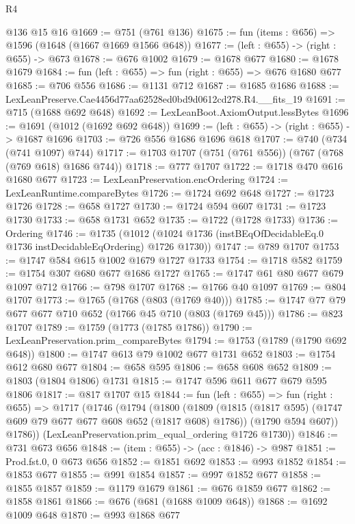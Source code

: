 \begin{lexlean}{R4}
\begin{coremodule}
    @136
    @15
    @16
@1669 := @751 (@761 @136)
@1675 := fun (items : @656) => @1596 (@1648 (@1667 @1669 @1566 @648))
@1677 := (left : @655) -> (right : @655) -> @673
@1678 := @676 @1002
@1679 := @1678 @677
@1680 := @1678 @1679
@1684 := fun (left : @655) => fun (right : @655) => @676 @1680 @677
@1685 := @706 @556
@1686 := @1131 @712
@1687 := @1685 @1686
@1688 := LexLeanPreserve.Cae4456d77aa62528ed0bd9d0612cd278.R4.__fits_19
@1691 := @715 (@1688 @692 @648)
@1692 := LexLeanBoot.AxiomOutput.lessBytes
@1696 := @1691 (@1012 (@1692 @692 @648))
@1699 := (left : @655) -> (right : @655) -> @1687 @1696
@1703 := @726 @556 @1686 @1696 @618
@1707 := @740 (@734 (@741 @1097) @744)
@1717 := @1703 @1707 (@751 (@761 @556)) (@767 (@768 (@769 @618) @1686 @744))
@1718 := @777 @1707
@1722 := @1718 @470 @616 @1680 @677
@1723 := LexLeanPreservation.encOrdering
@1724 := LexLeanRuntime.compareBytes
@1726 := @1724 @692 @648
@1727 := @1723 @1726
@1728 := @658 @1727
@1730 := @1724 @594 @607
@1731 := @1723 @1730
@1733 := @658 @1731 @652
@1735 := @1722 (@1728 @1733)
@1736 := Ordering
@1746 := @1735
    (@1012 (@1024 @1736 (instBEqOfDecidableEq.{0} @1736 instDecidableEqOrdering) @1726 @1730))
@1747 := @789 @1707
@1753 := @1747 @584 @615 @1002 @1679 @1727 @1733
@1754 := @1718 @582
@1759 := @1754 @307 @680 @677 @1686 @1727
@1765 := @1747 @61 @80 @677 @679 @1097 @712
@1766 := @798 @1707
@1768 := @1766 @40 @1097
@1769 := @804 @1707
@1773 := @1765 (@1768 (@803 (@1769 @40)))
@1785 := @1747 @77 @79 @677 @677 @710 @652 (@1766 @45 @710 (@803 (@1769 @45)))
@1786 := @823 @1707
@1789 := @1759 (@1773 (@1785 @1786))
@1790 := LexLeanPreservation.prim_compareBytes
@1794 := @1753 (@1789 (@1790 @692 @648))
@1800 := @1747 @613 @79 @1002 @677 @1731 @652
@1803 := @1754 @612 @680 @677
@1804 := @658 @595
@1806 := @658 @608 @652
@1809 := @1803 (@1804 @1806) @1731
@1815 := @1747 @596 @611 @677 @679 @595 @1806
@1817 := @817 @1707 @15
@1844 := fun (left : @655) =>
  fun (right : @655) =>
  @1717
    (@1746
      (@1794
        (@1800
          (@1809
            (@1815 (@1817 @595) (@1747 @609 @79 @677 @677 @608 @652 (@1817 @608) @1786))
            (@1790 @594 @607))
          @1786))
      (LexLeanPreservation.prim_equal_ordering @1726 @1730))
@1846 := @731 @673 @656
@1848 := (item : @655) -> (acc : @1846) -> @987
@1851 := Prod.fst.{0, 0} @673 @656
@1852 := @1851 @692
@1853 := @993 @1852
@1854 := @1853 @677
@1855 := @991 @1854
@1857 := @997 @1852 @677
@1858 := @1855 @1857
@1859 := @1179 @1679
@1861 := @676 @1859 @677
@1862 := @1858 @1861
@1866 := @676 (@681 (@1688 @1009 @648))
@1868 := @1692 @1009 @648
@1870 := @993 @1868 @677

\end{coremodule}
\end{lexlean}
